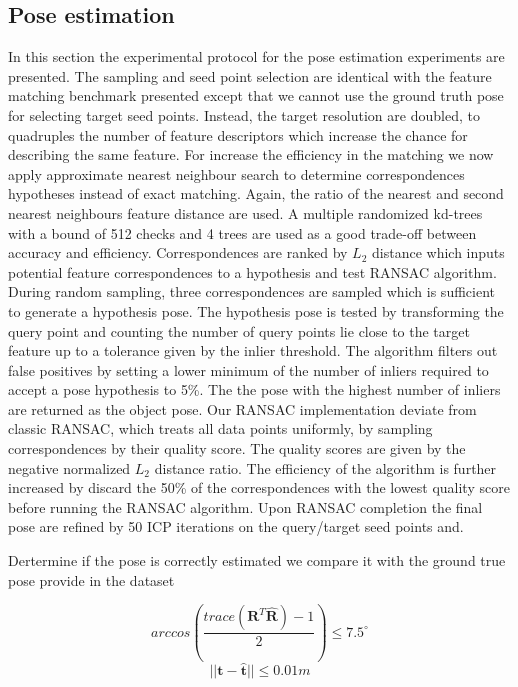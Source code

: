\documentclass[10pt,twocolumn,letterpaper]{article}
\begin{document}
\subsection{Pose estimation}
In this section the experimental protocol for the pose estimation experiments are presented. The sampling and seed point selection are identical with the feature matching benchmark presented except that we cannot use the ground truth pose for selecting target seed points. Instead, the target resolution are doubled, to quadruples the number of feature descriptors which increase the chance for describing the same feature. For increase the efficiency in the matching we now apply approximate nearest neighbour search to determine correspondences hypotheses instead of exact matching. Again, the ratio of the nearest and second nearest neighbours feature distance are used. A multiple randomized kd-trees with a bound of 512 checks and 4 trees are used as a good trade-off between accuracy and efficiency. Correspondences are ranked by ${L_2}$ distance which inputs potential feature correspondences to a hypothesis and test RANSAC algorithm.%
During random sampling, three correspondences are sampled which is sufficient to generate a hypothesis pose. The hypothesis pose is tested by transforming the query point and counting the number of query points lie close to the target feature up to a tolerance given by the inlier threshold. The algorithm filters out false positives by setting a lower minimum of the number of inliers required to accept a pose hypothesis to {\color{red}5\%}. The the pose with the highest number of inliers are returned as the object pose. Our RANSAC implementation deviate from classic RANSAC, which treats all data points uniformly, by sampling correspondences by their quality score. The quality scores are given by the negative normalized ${L_2}$ distance ratio. The efficiency of the algorithm is further increased by discard the 50\% of the correspondences with the lowest quality score before running the RANSAC algorithm. Upon RANSAC completion the final pose are refined by {\color{red}50} ICP iterations on the query/target seed points and.


Dertermine if the pose is correctly estimated we compare it with the ground true pose provide in the dataset

\begin{equation}\label{eq::rot}
arccos \left(\frac{trace(\textbf{R}^{T}\hat{\textbf{R}})-1}{2}\right) \leq 7.5^\circ
\end{equation}
\begin{equation}\label{eq::trans}
||\textbf{t} - \hat{\textbf{t}} || \leq 0.01m
\end{equation}
\end{document}
